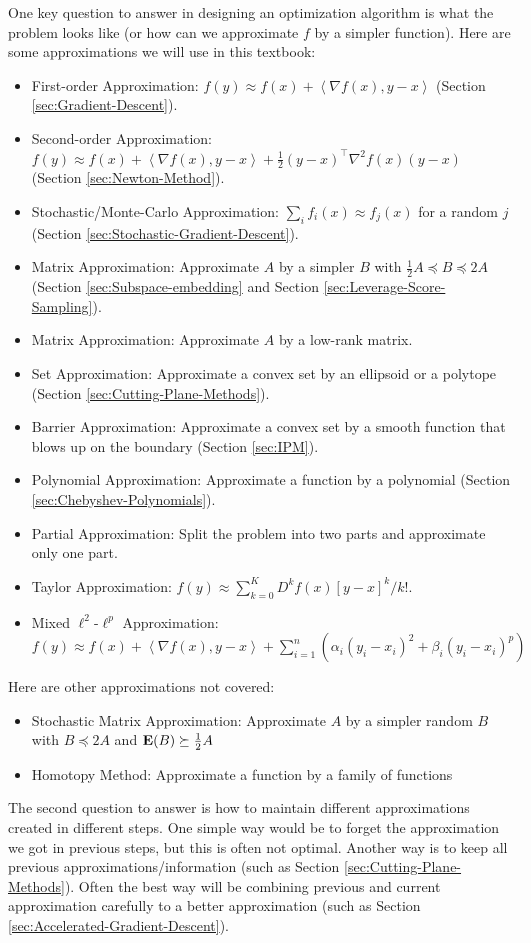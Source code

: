 One key question to answer in designing an optimization algorithm
is what the problem looks like (or how can we approximate $f$ by
a simpler function). Here are some approximations we will use in this
textbook:
\begin{itemize}
\item First-order Approximation: $f(y)\approx f(x)+\left\langle \nabla f(x),y-x\right\rangle $
(Section \ref{sec:Gradient-Descent}).
\item Second-order Approximation: $f(y)\approx f(x)+\left\langle \nabla f(x),y-x\right\rangle +\frac{1}{2}(y-x)^{\top}\nabla^{2}f(x)(y-x)$
(Section \ref{sec:Newton-Method}).
\item Stochastic/Monte-Carlo Approximation: $\sum_{i}f_{i}(x)\approx f_{j}(x)$
for a random $j$ (Section \ref{sec:Stochastic-Gradient-Descent}).
\item Matrix Approximation: Approximate $A$ by a simpler $B$ with $\frac{1}{2}A\preceq B\preceq2A$
(Section \ref{sec:Subspace-embedding} and Section \ref{sec:Leverage-Score-Sampling}).
\item Matrix Approximation: Approximate $A$ by a low-rank matrix.
\item Set Approximation: Approximate a convex set by an ellipsoid or a polytope
(Section \ref{sec:Cutting-Plane-Methods}).
\item Barrier Approximation: Approximate a convex set by a smooth function
that blows up on the boundary (Section \ref{sec:IPM}).
\item Polynomial Approximation: Approximate a function by a polynomial (Section
\ref{sec:Chebyshev-Polynomials}).
\item Partial Approximation: Split the problem into two parts and approximate
only one part.
\item Taylor Approximation: $f(y)\approx\sum^{K}_{k=0}D^{k}f(x)[y-x]^{k}/k!.$
\item Mixed $\ell^{2}$-$\ell^{p}$ Approximation: $f(y)\approx f(x)+\left\langle \nabla f(x),y-x\right\rangle +\sum^{n}_{i=1}(\alpha_{i}(y_{i}-x_{i})^{2}+\beta_{i}(y_{i}-x_{i})^{p})$
\end{itemize}
Here are other approximations not covered:
\begin{itemize}
\item Stochastic Matrix Approximation: Approximate $A$ by a simpler random
$B$ with $B\preceq2A$ and $\mathbf{E}(B)\succeq\frac{1}{2}A$ 
\item Homotopy Method: Approximate a function by a family of functions 
\end{itemize}
The second question to answer is how to maintain different approximations
created in different steps. One simple way would be to forget the
approximation we got in previous steps, but this is often not optimal.
Another way is to keep all previous approximations/information (such
as Section \ref{sec:Cutting-Plane-Methods}). Often the best way will
be combining previous and current approximation carefully to a better
approximation (such as Section \ref{sec:Accelerated-Gradient-Descent}).

